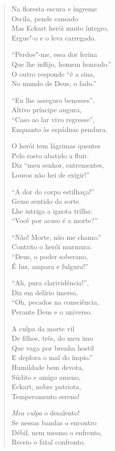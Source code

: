 \begin{verse}
Na floresta escura e íngreme\\
Oscila, pende cansado\\
Mas Eckart  herói muito íntegro,\\
Ergue"-o e o leva carregado.

``Perdoe"-me, essa dor ferina\\
Que lhe inflijo, homem honrado.''\\
O outro responde ``é a sina,\\
No mundo de Deus, o fado.''

``Eu lhe asseguro benesses'',\\
Altivo príncipe augura,\\
``Caso ao lar vivo regresse'',\\
Enquanto às espáduas pendura.

O herói tem lágrimas quentes\\
Pelo rosto abatido a fluir.\\
Diz ``meu senhor, entrementes,\\
Louros não hei de exigir!''

``A dor do corpo estilhaça!''\\
Geme sentido da sorte.\\
Lhe intriga a ignota trilha:\\
``Você por acaso é a morte?''

``Não! Morte, não me chamo.''\\
Contrito o herói murmura:\\
``Deus, o poder soberano,\\
É luz, ampara e fulgura!''

``Ah, pura clarividência!'',\\
Diz em delírio imerso,\\
``Oh, pecados na consciência,\\
Perante Deus e o universo.

A culpa da morte vil\\
De filhos, três, do meu imo\\
Que vaga por brenha hostil\\
E deplora o mal do ímpio.''\\
 
Humildade bem devota,\\
Súdito e amigo ameno,\\
Eckart, nobre patriota,\\
Temperamento sereno! 

\textit{Mea culpa} o desalento!\\
Se nessas bandas o encontro\\
Débil, nem mesmo o enfrento,\\
Receio o fatal confronto.


\end{verse}
